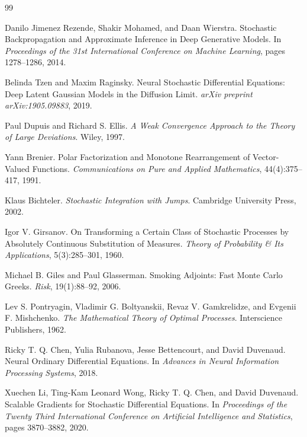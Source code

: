 \documentclass[11pt]{article}
\begin{document}
\begin{thebibliography}{99}

Danilo Jimenez Rezende, Shakir Mohamed, and Daan Wierstra.
\newblock Stochastic Backpropagation and Approximate Inference in Deep Generative Models.
\newblock In \textit{Proceedings of the 31st International Conference on Machine Learning}, pages 1278--1286, 2014.

Belinda Tzen and Maxim Raginsky.
\newblock Neural Stochastic Differential Equations: Deep Latent Gaussian Models in the Diffusion Limit.
\newblock \textit{arXiv preprint arXiv:1905.09883}, 2019.

Paul Dupuis and Richard S. Ellis.
\newblock \textit{A Weak Convergence Approach to the Theory of Large Deviations}.
\newblock Wiley, 1997.

Yann Brenier.
\newblock Polar Factorization and Monotone Rearrangement of Vector-Valued Functions.
\newblock \textit{Communications on Pure and Applied Mathematics}, 44(4):375--417, 1991.

Klaus Bichteler.
\newblock \textit{Stochastic Integration with Jumps}.
\newblock Cambridge University Press, 2002.

Igor V. Girsanov.
\newblock On Transforming a Certain Class of Stochastic Processes by Absolutely Continuous Substitution of Measures.
\newblock \textit{Theory of Probability \& Its Applications}, 5(3):285--301, 1960.

Michael B. Giles and Paul Glasserman.
\newblock Smoking Adjoints: Fast Monte Carlo Greeks.
\newblock \textit{Risk}, 19(1):88--92, 2006.

Lev S. Pontryagin, Vladimir G. Boltyanskii, Revaz V. Gamkrelidze, and Evgenii F. Mishchenko.
\newblock \textit{The Mathematical Theory of Optimal Processes}.
\newblock Interscience Publishers, 1962.

Ricky T. Q. Chen, Yulia Rubanova, Jesse Bettencourt, and David Duvenaud.
\newblock Neural Ordinary Differential Equations.
\newblock In \textit{Advances in Neural Information Processing Systems}, 2018.

Xuechen Li, Ting-Kam Leonard Wong, Ricky T. Q. Chen, and David Duvenaud.
\newblock Scalable Gradients for Stochastic Differential Equations.
\newblock In \textit{Proceedings of the Twenty Third International Conference on Artificial Intelligence and Statistics}, pages 3870--3882, 2020.

\end{thebibliography}
\end{document}
